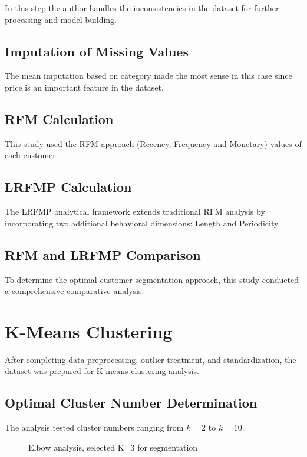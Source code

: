 \documentclass[12pt, a4paper, oneside]{report}
\begin{document}
In this step the author handles the inconsistencies in the dataset for further processing and model building.

\subsection{Imputation of Missing Values}

The mean imputation based on category made the most sense in this case since price is an important feature in the dataset.

\subsection{RFM Calculation}

This study used the RFM approach (Recency, Frequency and Monetary) values of each customer.

\subsection{LRFMP Calculation}

The LRFMP analytical framework extends traditional RFM analysis by incorporating two additional behavioral dimensions: Length and Periodicity.

\subsection{RFM and LRFMP Comparison}

To determine the optimal customer segmentation approach, this study conducted a comprehensive comparative analysis.


\section{K-Means Clustering}

After completing data preprocessing, outlier treatment, and standardization, the dataset was prepared for K-means clustering analysis.

\subsection{Optimal Cluster Number Determination}

The analysis tested cluster numbers ranging from $k=2$ to $k=10$.

\begin{figure}[H]
    \centering
    \caption{Elbow analysis, selected K=3 for segmentation}
    \label{fig:elbow}
\end{figure}
\end{document}
